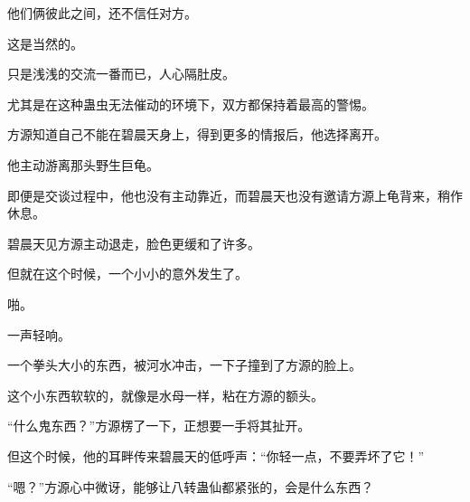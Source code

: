 \begin{this_body}
他们俩彼此之间，还不信任对方。

这是当然的。

只是浅浅的交流一番而已，人心隔肚皮。

尤其是在这种蛊虫无法催动的环境下，双方都保持着最高的警惕。

方源知道自己不能在碧晨天身上，得到更多的情报后，他选择离开。

他主动游离那头野生巨龟。

即便是交谈过程中，他也没有主动靠近，而碧晨天也没有邀请方源上龟背来，稍作休息。

碧晨天见方源主动退走，脸色更缓和了许多。

但就在这个时候，一个小小的意外发生了。

啪。

一声轻响。

一个拳头大小的东西，被河水冲击，一下子撞到了方源的脸上。

这个小东西软软的，就像是水母一样，粘在方源的额头。

“什么鬼东西？”方源楞了一下，正想要一手将其扯开。

但这个时候，他的耳畔传来碧晨天的低呼声：“你轻一点，不要弄坏了它！”

“嗯？”方源心中微讶，能够让八转蛊仙都紧张的，会是什么东西？

\end{this_body}

